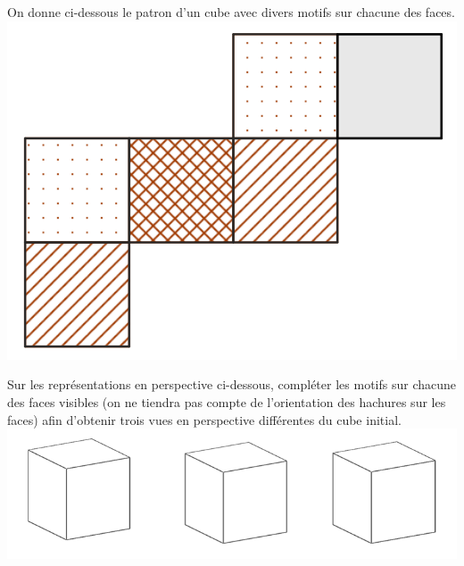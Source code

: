 
On donne ci-dessous le patron d’un cube avec divers motifs sur chacune des faces.\\
\includegraphics[scale=0.4]{RepS-flash3}

\medskip
 
Sur les représentations en perspective ci-dessous, compléter les motifs sur chacune des faces
visibles (on ne tiendra pas compte de l’orientation des hachures sur les faces) afin d’obtenir
trois vues en perspective différentes du cube initial.
\includegraphics[scale=0.7]{RepS-flash3b}

